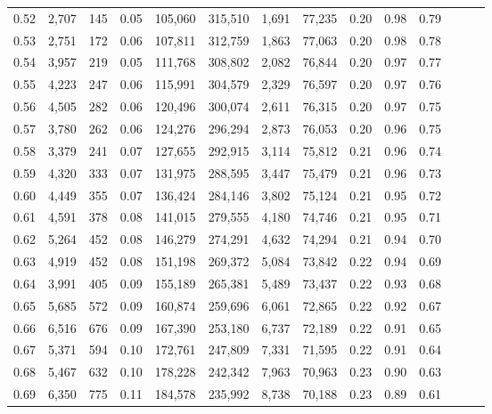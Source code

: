 \begin{tabular}{rrrrrrrrrrrrrr}
0.52 &   2,707 &    145 &  0.05 &  105,060 &  315,510 &   1,691 &  77,235 &  0.20 &  0.98 &      0.79 \\
0.53 &   2,751 &    172 &  0.06 &  107,811 &  312,759 &   1,863 &  77,063 &  0.20 &  0.98 &      0.78 \\
0.54 &   3,957 &    219 &  0.05 &  111,768 &  308,802 &   2,082 &  76,844 &  0.20 &  0.97 &      0.77 \\
0.55 &   4,223 &    247 &  0.06 &  115,991 &  304,579 &   2,329 &  76,597 &  0.20 &  0.97 &      0.76 \\
0.56 &   4,505 &    282 &  0.06 &  120,496 &  300,074 &   2,611 &  76,315 &  0.20 &  0.97 &      0.75 \\
0.57 &   3,780 &    262 &  0.06 &  124,276 &  296,294 &   2,873 &  76,053 &  0.20 &  0.96 &      0.75 \\
0.58 &   3,379 &    241 &  0.07 &  127,655 &  292,915 &   3,114 &  75,812 &  0.21 &  0.96 &      0.74 \\
0.59 &   4,320 &    333 &  0.07 &  131,975 &  288,595 &   3,447 &  75,479 &  0.21 &  0.96 &      0.73 \\
0.60 &   4,449 &    355 &  0.07 &  136,424 &  284,146 &   3,802 &  75,124 &  0.21 &  0.95 &      0.72 \\
0.61 &   4,591 &    378 &  0.08 &  141,015 &  279,555 &   4,180 &  74,746 &  0.21 &  0.95 &      0.71 \\
0.62 &   5,264 &    452 &  0.08 &  146,279 &  274,291 &   4,632 &  74,294 &  0.21 &  0.94 &      0.70 \\
0.63 &   4,919 &    452 &  0.08 &  151,198 &  269,372 &   5,084 &  73,842 &  0.22 &  0.94 &      0.69 \\
0.64 &   3,991 &    405 &  0.09 &  155,189 &  265,381 &   5,489 &  73,437 &  0.22 &  0.93 &      0.68 \\
0.65 &   5,685 &    572 &  0.09 &  160,874 &  259,696 &   6,061 &  72,865 &  0.22 &  0.92 &      0.67 \\
0.66 &   6,516 &    676 &  0.09 &  167,390 &  253,180 &   6,737 &  72,189 &  0.22 &  0.91 &      0.65 \\
0.67 &   5,371 &    594 &  0.10 &  172,761 &  247,809 &   7,331 &  71,595 &  0.22 &  0.91 &      0.64 \\
0.68 &   5,467 &    632 &  0.10 &  178,228 &  242,342 &   7,963 &  70,963 &  0.23 &  0.90 &      0.63 \\
0.69 &   6,350 &    775 &  0.11 &  184,578 &  235,992 &   8,738 &  70,188 &  0.23 &  0.89 &      0.61 \\

\end{tabular}
